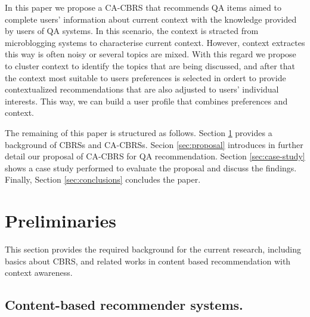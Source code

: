 \documentclass[preprint]{elsarticle}
\begin{document}
\begin{spacing}{1.5}
In this paper we propose a CA-CBRS that recommends QA items aimed to complete users' information about current context with the knowledge provided by users of QA systems. In this scenario, the context is stracted from microblogging systems to characterise current context. However, context extractes this way is often noisy or several topics are mixed. With this regard we propose to cluster context to identify the topics that are being discussed, and after that the context most suitable to users preferences is selected in ordert to provide contextualized recommendations that are also adjusted to users' individual interests. This way, we can build a user profile that combines preferences and context.

The remaining of this paper is structured as follows. Section \ref{sec:preliminaries} provides a background of CBRSs and CA-CBRSs. Secion \ref{sec:proposal} introduces in further detail our proposal of CA-CBRS for QA recommendation. Section \ref{sec:case-study} shows a case study performed to evaluate the proposal and discuss the findings. Finally, Section \ref{sec:conclusions} concludes the paper.



\section{Preliminaries}
\label{sec:preliminaries}

This section provides the required background for the current research, including basics about CBRS, and related works in content based recommendation with context awareness.

\subsection{Content-based recommender systems.}


\end{spacing}
\end{document}
